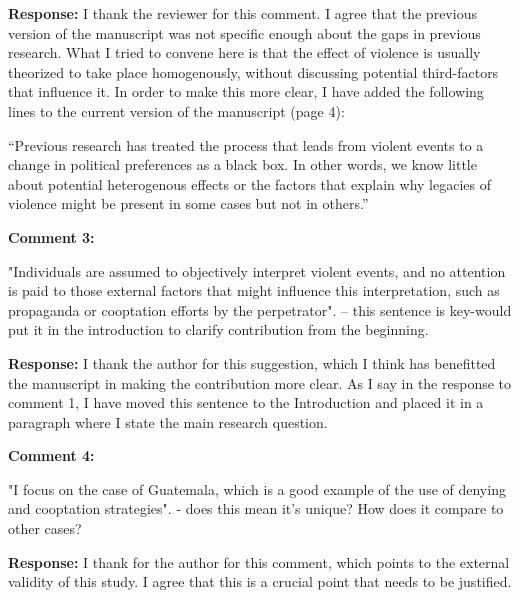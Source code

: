 \documentclass[12pt, a4paper, notitlepage]{article}
\begin{document}
\noindent\textbf{Response:} I thank the reviewer for this comment. I agree that the previous version of the manuscript was not specific enough about the gaps in previous research. What I tried to convene here is that the effect of violence is usually theorized to take place homogenously, without discussing potential third-factors that influence it. In order to make this more clear, I have added the following lines to the current version of the manuscript (page 4):

``Previous research has treated the process that leads from violent events to a change in political preferences as a black box.
In other words, we know little about potential heterogenous effects or the factors that explain why legacies of violence might be present in some cases but not in others.''


\vspace{15pt}
\noindent\textbf{Comment 3:}
\begin{displayquote}
"Individuals are assumed to objectively interpret violent events, and no attention is paid to those external factors that might influence this interpretation, such as propaganda or cooptation efforts by the perpetrator". -- this sentence is key-would put it in the introduction to clarify contribution from the beginning.
\end{displayquote}

\noindent\textbf{Response:} I thank the author for this suggestion, which I think has benefitted the manuscript in making the contribution more clear. As I say in the response to comment 1, I have moved this sentence to the Introduction and placed it in a paragraph where I state the main research question.

\vspace{15pt}
\noindent\textbf{Comment 4:}
\begin{displayquote}
"I focus on the case of Guatemala, which is a good example of the use of denying and cooptation strategies". - does this mean it's unique? How does it compare to other cases?
\end{displayquote}

\noindent\textbf{Response:} I thank for the author for this comment, which points to the external validity of this study. I agree that this is a crucial point that needs to be justified.
\end{document}
